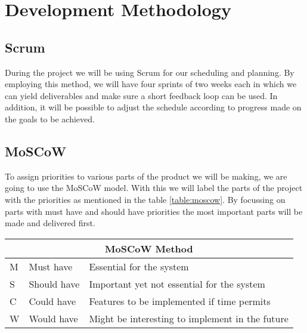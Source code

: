 \section{Development Methodology}\label{sec:devmet}
\subsection{Scrum}
During the project we will be using Scrum for our scheduling and planning. By employing this method, we will have four sprints of two weeks each in which we can yield deliverables and make sure a short feedback loop can be used. In addition, it will be possible to adjust the schedule according to progress made on the goals to be achieved.

\subsection{MoSCoW}
To assign priorities to various parts of the product we will be making, we are going to use the MoSCoW model. With this we will label the parts of the project with the priorities as mentioned in the table \ref{table:moscow}. By focussing on parts with must have and should have priorities the most important parts will be made and delivered first.\\[1cm]

{\renewcommand{\arraystretch}{1.5}
	\centering
	
	\begin{tabular}{ | l | l | l | }
		\multicolumn{3}{c}{\bfseries{MoSCoW Method}} \\ \hline
		M & Must have & Essential for the system\\ \hline
		S & Should have & Important yet not essential for the system \\ \hline
		C & Could have & Features to be implemented if time permits \\ \hline
		W & Would have & Might be interesting to implement in the future \\ \hline 
	\end{tabular}
	\label{table:moscow}
	
}

